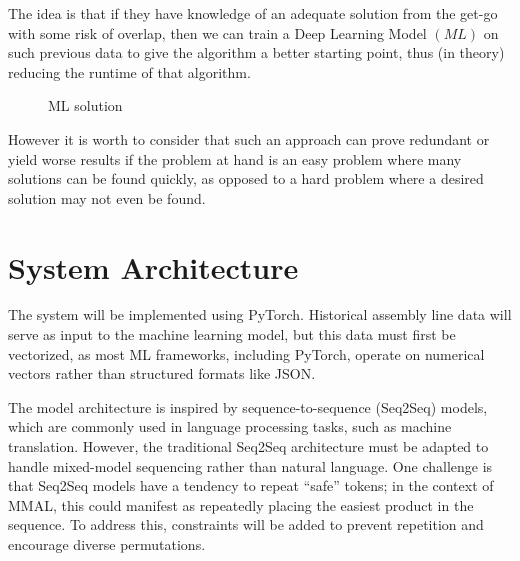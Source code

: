 \documentclass[12pt,a4paper]{report}
\begin{document}
The idea is that if they have knowledge of an adequate solution from the get-go with some risk of overlap, then we can train a Deep Learning Model $(M\!L)$ on such previous data to give the algorithm a better starting point, thus (in theory) reducing the runtime of that algorithm.

\begin{figure}[ht]
    \centering
    \caption{ML solution}
    \label{fig:ml_solution}
\end{figure}

However it is worth to consider that such an approach can prove redundant or yield worse results if the problem at hand is an easy problem where many solutions can be found quickly, as opposed to a hard problem where a desired solution may not even be found. 

\section{System Architecture}

The system will be implemented using PyTorch. Historical assembly line data will serve as input to the machine learning model, but this data must first be vectorized, as most ML frameworks, including PyTorch, operate on numerical vectors rather than structured formats like JSON.

The model architecture is inspired by sequence-to-sequence (Seq2Seq) models, which are commonly used in language processing tasks, such as machine translation. However, the traditional Seq2Seq architecture must be adapted to handle mixed-model sequencing rather than natural language. One challenge is that Seq2Seq models have a tendency to repeat “safe” tokens; in the context of MMAL, this could manifest as repeatedly placing the easiest product in the sequence. To address this, constraints will be added to prevent repetition and encourage diverse permutations. 
\end{document}
